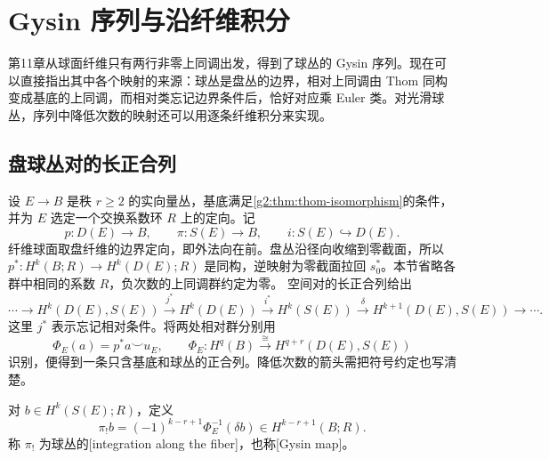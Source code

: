 
% 
% 
% 

\section{Gysin 序列与沿纤维积分}
\label{g2:sec:2004}

第11章从球面纤维只有两行非零上同调出发，得到了球丛的 Gysin 序列。现在可以直接指出其中各个映射的来源：球丛是盘丛的边界，相对上同调由 Thom 同构变成基底的上同调，而相对类忘记边界条件后，恰好对应乘 Euler 类。对光滑球丛，序列中降低次数的映射还可以用逐条纤维积分来实现。

\subsection{盘球丛对的长正合列}
\label{g2:subsec:2004:01}
设 \(E\to B\) 是秩 \(r\ge2\) 的实向量丛，基底满足\cref{g2:thm:thom-isomorphism}的条件，并为 \(E\) 选定一个交换系数环 \(R\) 上的定向。记
\[
	p:D(E)\longrightarrow B,\qquad \pi:S(E)\longrightarrow B,\qquad i:S(E)\hookrightarrow D(E).
\]
纤维球面取盘纤维的边界定向，即外法向在前。盘丛沿径向收缩到零截面，所以 \(p^*:H^k(B;R)\to H^k(D(E);R)\) 是同构，逆映射为零截面拉回 \(s_0^*\)。本节省略各群中相同的系数 \(R\)，负次数的上同调群约定为零。
\ProseParagraphBreak
空间对的长正合列给出
\begin{equation}\label{g2:eq:disk-sphere-pair-sequence}
	\cdots\longrightarrow H^k(D(E),S(E))\xrightarrow{j^*}H^k(D(E))\xrightarrow{i^*}H^k(S(E))\xrightarrow{\delta}H^{k+1}(D(E),S(E))\longrightarrow\cdots.
\end{equation}
这里 \(j^*\) 表示忘记相对条件。将两处相对群分别用
\[
	\Phi_E(a)=p^*a\smile u_E,\qquad
	\Phi_E:H^q(B)\xrightarrow{\cong}H^{q+r}(D(E),S(E))
\]
识别，便得到一条只含基底和球丛的正合列。降低次数的箭头需把符号约定也写清楚。

\begin{definition}\label{g2:def:thom-gysin-map}
	对 \(b\in H^k(S(E);R)\)，定义
	\begin{equation}\label{g2:eq:normalized-sphere-integration}
		\pi_!b=(-1)^{k-r+1}\Phi_E^{-1}(\delta b)\in H^{k-r+1}(B;R).
	\end{equation}
	称 \(\pi_!\) 为球丛的[integration along the fiber]，也称[Gysin map]。
\end{definition}

